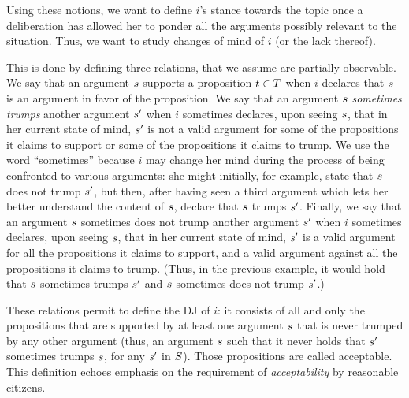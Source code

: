 \documentclass[version=3.21, pagesize, twoside=off, bibliography=totoc, DIV=calc, fontsize=12pt, a4paper, french, english]{scrartcl}
\begin{document}
Using these notions, we want to define $i$’s stance towards the topic once a deliberation has allowed her to ponder all the arguments possibly relevant to the situation. 
Thus, we want to study changes of mind of $i$ (or the lack thereof).

This is done by defining three relations, that we assume are partially observable. We say that an argument $s$ supports a proposition $t \in T$ when $i$ declares that $s$ is an argument in favor of the proposition. We say that an argument $s$ \emph{sometimes trumps} another argument $s'$ when $i$ sometimes declares, upon seeing $s$, that in her current state of mind, $s'$ is not a valid argument for some of the propositions it claims to support or some of the propositions it claims to trump. We use the word ``sometimes'' because $i$ may change her mind during the process of being confronted to various arguments: she might initially, for example, state that $s$ does not trump $s'$, but then, after having seen a third argument which lets her better understand the content of $s$, declare that $s$ trumps $s'$. Finally, we say that an argument $s$ sometimes does not trump another argument $s'$ when $i$ sometimes declares, upon seeing $s$, that in her current state of mind, $s'$ is a valid argument for all the propositions it claims to support, and a valid argument against all the propositions it claims to trump. (Thus, in the previous example, it would hold that $s$ sometimes trumps $s'$ and $s$ sometimes does not trump $s'$.)

These relations permit to define the \ac{DJ} of $i$: it consists of all and only the propositions that are supported by at least one argument $s$ that is never trumped by any other argument (thus, an argument $s$ such that it never holds that $s'$ sometimes trumps $s$, for any $s'$ in $S$). Those propositions are called acceptable. This definition echoes  emphasis on the requirement of \emph{acceptability} by reasonable citizens. 
\end{document}
